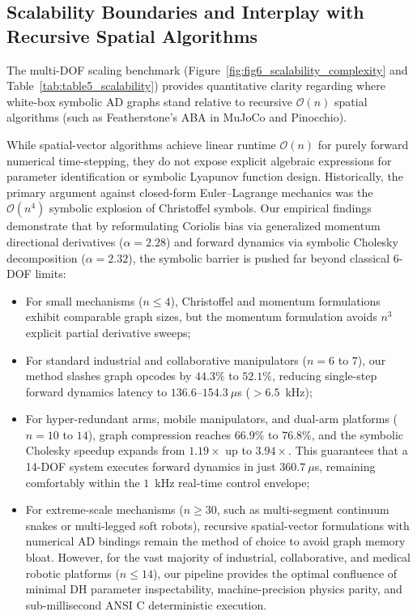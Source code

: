\documentclass[fleqn,10pt]{article}
\begin{document}
	\subsection*{Scalability Boundaries and Interplay with Recursive Spatial Algorithms}
	
	The multi-DOF scaling benchmark (Figure~\ref{fig:fig6_scalability_complexity} and Table~\ref{tab:table5_scalability}) provides quantitative clarity regarding where white-box symbolic AD graphs stand relative to recursive $\mathcal{O}(n)$ spatial algorithms (such as Featherstone's ABA in MuJoCo and Pinocchio).
	
	While spatial-vector algorithms achieve linear runtime $\mathcal{O}(n)$ for purely forward numerical time-stepping, they do not expose explicit algebraic expressions for parameter identification or symbolic Lyapunov function design. Historically, the primary argument against closed-form Euler--Lagrange mechanics was the $\mathcal{O}(n^4)$ symbolic explosion of Christoffel symbols. Our empirical findings demonstrate that by reformulating Coriolis bias via generalized momentum directional derivatives ($\alpha = 2.28$) and forward dynamics via symbolic Cholesky decomposition ($\alpha = 2.32$), the symbolic barrier is pushed far beyond classical 6-DOF limits:
	\begin{itemize}
		\item For small mechanisms ($n \le 4$), Christoffel and momentum formulations exhibit comparable graph sizes, but the momentum formulation avoids $n^3$ explicit partial derivative sweeps;
		\item For standard industrial and collaborative manipulators ($n = 6$ to $7$), our method slashes graph opcodes by $44.3\%$ to $52.1\%$, reducing single-step forward dynamics latency to $136.6$--$154.3~\mu$s ($>6.5$~kHz);
		\item For hyper-redundant arms, mobile manipulators, and dual-arm platforms ($n = 10$ to $14$), graph compression reaches $66.9\%$ to $76.8\%$, and the symbolic Cholesky speedup expands from $1.19\times$ up to $3.94\times$. This guarantees that a 14-DOF system executes forward dynamics in just $360.7~\mu$s, remaining comfortably within the $1$~kHz real-time control envelope;
		\item For extreme-scale mechanisms ($n \ge 30$, such as multi-segment continuum snakes or multi-legged soft robots), recursive spatial-vector formulations with numerical AD bindings remain the method of choice to avoid graph memory bloat. However, for the vast majority of industrial, collaborative, and medical robotic platforms ($n \le 14$), our pipeline provides the optimal confluence of minimal DH parameter inspectability, machine-precision physics parity, and sub-millisecond ANSI C deterministic execution.
	\end{itemize}
	
\end{document}

